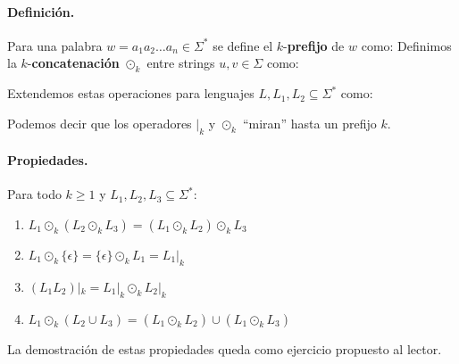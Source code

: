 \paragraph{Definición.} Para una palabra $w=a_1a_2\ldots a_n \in \Sigma^*$ se define el $k$-\textbf{prefijo} de $w$ como:
Definimos la $k$-\textbf{concatenación} $\odot_k$ entre strings $u,v \in \Sigma$ como:

Extendemos estas operaciones para lenguajes $L,L_1,L_2 \subseteq \Sigma^*$ como:

Podemos decir que los operadores $|_k$ y $\odot_k$ ``miran'' hasta un prefijo $k$.

\paragraph{Propiedades.} Para todo $k\ge 1$ y $L_1,L_2,L_3 \subseteq \Sigma^*$:
\begin{enumerate}
    \item $L_1 \odot_k (L_2 \odot_k L_3) = (L_1 \odot_k L_2) \odot_k L_3$
    \item $L_1 \odot_k \{\epsilon\} = \{\epsilon\} \odot_k L_1 = L_1|_k$
    \item $(L_1 L_2)|_k = L_1|_k \odot_k L_2|_k$
    \item $L_1 \odot_k (L_2 \cup L_3) = (L_1 \odot_k L_2) \cup (L_1 \odot_k L_3)$
\end{enumerate}
La demostración de estas propiedades queda como ejercicio propuesto al lector.


